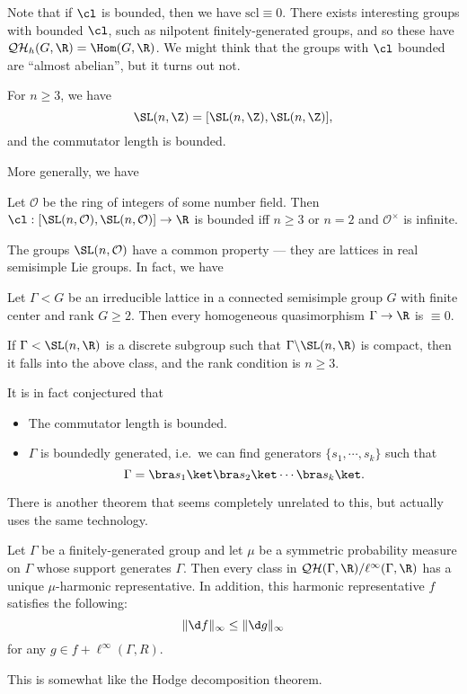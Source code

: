 \documentclass[a4paper]{article}
\newcommand\QH{\mathcal{QH}}
\newcommand\scl{\mathrm{scl}}
\begin{document}
Note that if $\cl$ is bounded, then we have $\scl \equiv 0$. There exists interesting groups with bounded $\cl$, such as nilpotent finitely-generated groups, and so these have $\QH_h(G, \R) = \Hom(G, \R)$. We might think that the groups with $\cl$ bounded are ``almost abelian'', but it turns out not.

\begin{thm}
  For $n \geq 3$, we have
  \[
    \SL(n, \Z) = [\SL(n, \Z), \SL(n, \Z)],
  \]
  and the commutator length is bounded.
\end{thm}

More generally, we have
\begin{thm}
  Let $\mathcal{O}$ be the ring of integers of some number field. Then $\cl: [\SL(n, \mathcal{O}), \SL(n, \mathcal{O})] \to \R$ is bounded iff $n \geq 3$ or $n = 2$ and $\mathcal{O}^\times$ is infinite.
\end{thm}
The groups $\SL(n, \mathcal{O})$ have a common property --- they are lattices in real semisimple Lie groups. In fact, we have

\begin{thm}
  Let $\Gamma < G$ be an irreducible lattice in a connected semisimple group $G$ with finite center and rank $G \geq 2$. Then every homogeneous quasimorphism $\Gamma \to \R$ is $\equiv 0$.
\end{thm}

\begin{eg}
  If $\Gamma < \SL(n, \R)$ is a discrete subgroup such that $\Gamma \backslash \SL(n, \R)$ is compact, then it falls into the above class, and the rank condition is $n \geq 3$.
\end{eg}
It is in fact conjectured that
\begin{itemize}
  \item The commutator length is bounded.
  \item $\Gamma$ is boundedly generated, i.e.\ we can find generators $\{s_1, \cdots, s_k\}$ such that
    \[
      \Gamma = \bra s_1 \ket \bra s_2\ket \cdots \bra s_k\ket.
    \]
\end{itemize}

There is another theorem that seems completely unrelated to this, but actually uses the same technology.
\begin{thm}
  Let $\Gamma$ be a finitely-generated group and let $\mu$ be a symmetric probability measure on $\Gamma$ whose support generates $\Gamma$. Then every class in $\QH(\Gamma, \R)/\ell^\infty(\Gamma, \R)$ has a unique $\mu$-harmonic representative. In addition, this harmonic representative $f$ satisfies the following:
  \[
    \|\d f\|_\infty \leq \|\d g\|_\infty
  \]
  for any $g \in f+ \ell^\infty(\Gamma, R)$.
\end{thm}
This is somewhat like the Hodge decomposition theorem.
\end{document}
